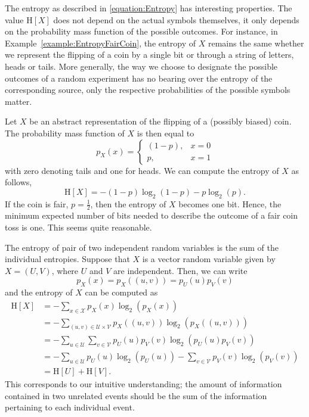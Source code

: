 The entropy as described in \eqref{equation:Entropy} has interesting properties.
The value $\mathrm{H}[X]$ does not depend on the actual symbols themselves, it only depends on the probability mass function of the possible outcomes.
For instance, in Example~\ref{example:EntropyFairCoin}, the entropy of $X$ remains the same whether we represent the flipping of a coin by a single bit or through a string of letters, heads or tails.
More generally, the way we choose to designate the possible outcomes of a random experiment has no bearing over the entropy of the corresponding source, only the respective probabilities of the possible symbols matter.

\begin{example} \label{example:EntropyFairCoin}
Let $X$ be an abstract representation of the flipping of a (possibly biased) coin.
The probability mass function of $X$ is then equal to
\begin{equation*}
p_X(x) = \begin{cases} (1-p), & x = 0 \\
p, & x = 1 \end{cases}
\end{equation*}
with zero denoting tails and one for heads.
We can compute the entropy of $X$ as follows,
\begin{equation*}
\mathrm{H}[X] = - (1-p) \log_2 (1-p)
- p \log_2 (p) .
\end{equation*}
If the coin is fair, $p = \frac{1}{2}$, then the entropy of $X$ becomes one  bit.
Hence, the minimum expected number of bits needed to describe the outcome of a fair coin toss is one.
This seems quite reasonable.
\end{example}

%
%

The entropy of pair of two independent random variables is the sum of the individual entropies.
Suppose that $X$ is a vector random variable given by $X = (U, V)$, where $U$ and $V$ are independent.
Then, we can write
\begin{equation*}
p_X(x) = p_X((u, v)) = p_{U} (u) p_{V} (v)
\end{equation*}
and the entropy of $X$ can be computed as
\begin{equation*}
\begin{split}
\mathrm{H}[X] &= - \sum_{ x \in \mathcal{X} } p_X(x) \log_2 ( p_X(x) ) \\
&= - \sum_{(u, v) \in \mathcal{U} \times \mathcal{V}}
p_X((u, v)) \log_2 ( p_X((u, v)) ) \\
&= - \sum_{u \in \mathcal{U}} \sum_{v \in \mathcal{V}}
p_{U} (u) p_{V} (v) \log_2 ( p_{U} (u) p_{V} (v) ) \\
&= - \sum_{u \in \mathcal{U}}
p_{U} (u) \log_2 ( p_{U} (u) )
- \sum_{v \in \mathcal{V}}
p_{V} (v) \log_2 ( p_{V} (v) ) \\
&= \mathrm{H}[U] + \mathrm{H}[V] .
\end{split}
\end{equation*}
This corresponds to our intuitive understanding; the amount of information contained in two unrelated events should be the sum of the information pertaining to each individual event.

